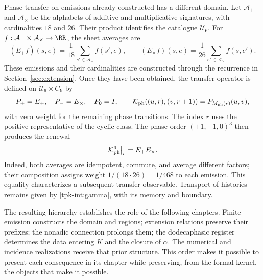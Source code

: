 Phase transfer on emissions already constructed has a different
domain. Let \(\mathcal A_+\) and \(\mathcal A_\times\) be the
alphabets of additive and multiplicative signatures, with cardinalities \(18\)
and \(26\). Their product identifies the catalogue \(\mathcal U_6\).
For \(f:\mathcal A_+\times\mathcal A_\times\to\RR\),
the sheet averages are
\[
 (E_+f)(s,e)=\frac1{18}\sum_{s'\in\mathcal A_+}f(s',e),\qquad
 (E_\times f)(s,e)=\frac1{26}\sum_{e'\in\mathcal A_\times}f(s,e').
\]
These emissions and their cardinalities are constructed through
the recurrence in Section~\ref{sec:extension}. Once they have been obtained,
the transfer operator is defined on
\(\mathcal U_6\times C_9\) by
\[
 P_+=E_+,\quad P_-=E_\times,\quad P_0=I,\qquad
 \mathcal K_{\rm ph}((u,r),(v,r+1))=P_{M_{\rm ph}(r)}(u,v),
\]
with zero weight for the remaining phase transitions. The index
\(r\) uses the positive representative of the cyclic class.
The phase order \((+1,-1,0)^3\) then produces the renewal
\[
 \mathcal K_{\rm ph}^{9}\big|_r=E_+E_\times.
\]
Indeed, both averages are idempotent, commute, and average different
factors; their composition assigns weight \(1/(18\cdot26)=1/468\)
to each emission. This equality characterizes a subsequent transfer
observable. Transport of histories remains given by
\eqref{tpk-int:gamma}, with its memory and boundary.

The resulting hierarchy establishes the role of the following chapters.
Finite emission constructs the domain and regions; extension
relations preserve their prefixes; the nonadic connection prolongs them; the
dodecaphasic register determines the data entering \(K\) and
the closure of \(\alpha\). The numerical and incidence
realizations receive that prior structure. This order makes it possible to present
each consequence in its chapter while preserving, from the formal kernel,
the objects that make it possible.
